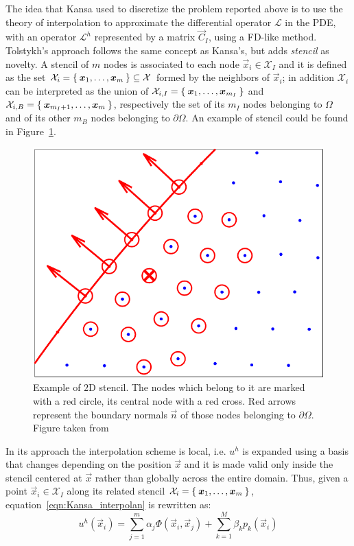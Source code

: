 The idea that Kansa used to discretize the problem reported above is to use the theory of interpolation to approximate the differential operator $\mathcal{L}$ in the PDE, with an operator $\mathcal{L}^h$ represented by a matrix $\vec{C}_I$, using a FD-like method.
Tolstykh's approach follows the same concept as Kansa's, but adds \emph{stencil} as novelty. A stencil of $m$ nodes is associated to each node $\vec{x}_i \in \mathcal{X}_I$ and it is defined as the set $\mathcal{X}_i = \Set{\boldsymbol{x}_1, \dots, \boldsymbol{x}_m} \subseteq \mathcal{X}$ formed by the neighbors of $\vec{x}_i$; in addition $\mathcal{X}_i$ can be interpreted as the union of $\mathcal{X}_{i,I} = \Set{\boldsymbol{x}_1, \dots, \boldsymbol{x}_{m_I}}$ and $\mathcal{X}_{i,B} = \Set{\boldsymbol{x}_{m_I+1}, \dots, \boldsymbol{x}_m}$, respectively the set of its $m_I$ nodes belonging to $\Omega$ and of its other $m_B$ nodes belonging to $\partial\Omega$. An example of stencil could be found in Figure~\ref{fig:2D_stencil}.

\begin{figure}
\centering
\includegraphics[width=.5\textwidth]{img/2D_stencil}
\caption{Example of $2$D stencil. The nodes which belong to it are marked with a red circle, its central node with a red cross. Red arrows represent the boundary normals $\vec{n}$ of those nodes belonging to $\partial\Omega$. Figure taken from~\cite{Miotti:phd_thesis}} 
\label{fig:2D_stencil}
\end{figure}

In its approach the interpolation scheme is local, i.e. $u^h$ is expanded using a basis that changes depending on the position $\vec{x}$ and it is made valid only inside the stencil centered at $\vec{x}$ rather than globally across the entire domain. Thus, given a point $\vec{x}_i \in \mathcal{X}_I$ along its related stencil $\mathcal{X}_i = \Set{\boldsymbol{x}_1, \dots, \boldsymbol{x}_m}$, equation~\eqref{eqn:Kansa_interpolan} is rewritten as:
\begin{equation}
	\label{eqn:local_RBF-FD_interpolant}
	u^h(\vec{x}_i) = \sum_{j=1}^{m} \alpha_j \Phi(\vec{x}_i, \vec{x}_j) + \sum_{k=1}^{M} \beta_k p_k(\vec{x}_i)
\end{equation}

